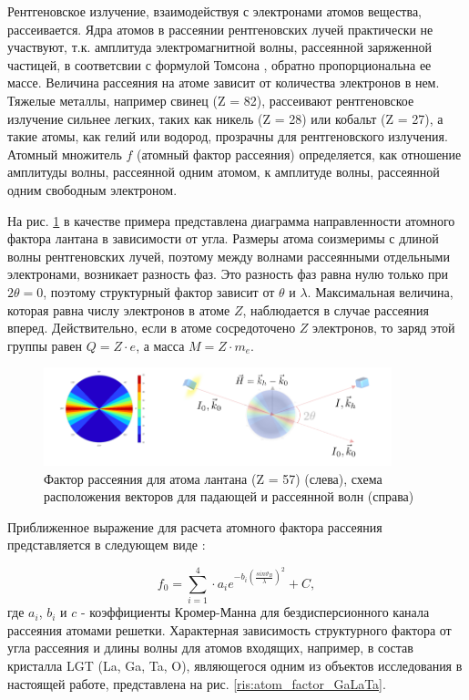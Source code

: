 
Рентгеновское излучение, взаимодействуя с электронами атомов вещества, рассеивается.
Ядра атомов в рассеянии рентгеновских лучей практически не участвуют, т.к.
амплитуда электромагнитной волны, рассеянной заряженной частицей, в соответсвии с формулой
Томсона \cite{iveronova1972}, обратно пропорциональна ее массе. Величина рассеяния
на атоме зависит от количества электронов в нем. Тяжелые металлы,
 например свинец (Z = 82), рассеивают рентгеновское излучение сильнее легких,
 таких как никель (Z = 28) или  кобальт (Z = 27), а такие атомы, как гелий или водород, прозрачны
 для рентгеновского излучения.  Атомный множитель $f$ (атомный фактор рассеяния) определяется,
как отношение амплитуды волны, рассеянной одним атомом, к амплитуде волны, рассеянной
одним свободным электроном.

На рис. \ref{ris:atom_factor} в качестве примера представлена диаграмма направленности атомного
фактора лантана в зависимости от угла. Размеры атома соизмеримы с длиной волны
рентгеновских лучей, поэтому между волнами рассеянными отдельными электронами, возникает
разность фаз. Это разность фаз равна нулю только при $2 \theta = 0$, поэтому структурный
фактор зависит от $\theta$ и $\lambda$. Максимальная величина, которая равна числу электронов в атоме $Z$,
 наблюдается в случае рассеяния вперед. Действительно, если в атоме сосредоточено
 $Z$ электронов, то заряд этой группы равен $Q = Z\cdot e$, а масса $M = Z \cdot m_e$.

\begin{figure}[H]
  \centering
  \includegraphics[width=0.9\textwidth]{images/atom_factor.png}
  \caption{Фактор рассеяния для атома лантана (Z = 57) (слева),
  схема расположения векторов для падающей и рассеянной волн (справа)}
  \label{ris:atom_factor}
\end{figure}

Приближенное выражение для расчета атомного фактора рассеяния
представляется в следующем виде \cite{International_Tables}:

\begin{equation}
  f_0 = \sum_{i=1}^{4} \cdot a_i e^{ -b_i (\frac{sin \vartheta_B}{\lambda})^2} + C,
 \end{equation}
где $a_i$, $b_i$ и $c$ - коэффициенты Кромер-Манна для бездисперсионного канала рассеяния атомами решетки.
Характерная зависимость структурного фактора от угла рассеяния и длины волны
для атомов входящих, например, в состав кристалла LGT (La, Ga, Ta, O), являющегося
одним из объектов исследования в настоящей работе, представлена на рис. \ref{ris:atom_factor_GaLaTa}.

